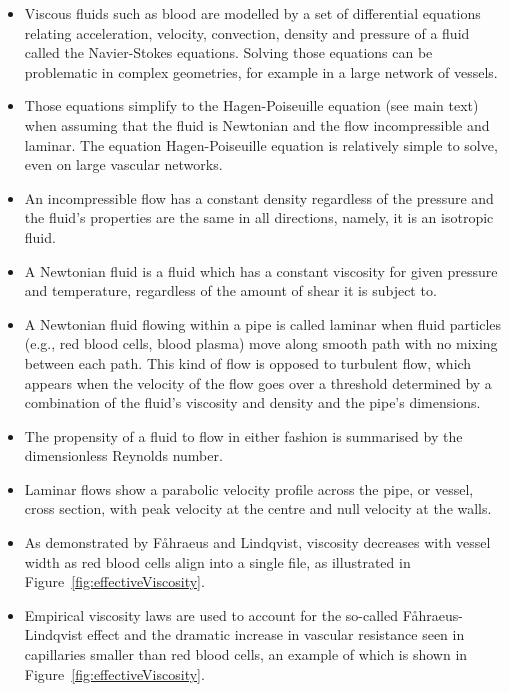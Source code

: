 \documentclass{article}
\begin{document}
\begin{tcolorbox}[title=Additional information -- Fluid flow modelling]
  \begin{itemize}
  \item Viscous fluids such as blood are modelled by a set of differential equations relating acceleration, velocity, convection, density and pressure of a fluid called the Navier-Stokes equations.
    Solving those equations can be problematic in complex geometries, for example in a large network of vessels.
  \item Those equations simplify to the Hagen-Poiseuille equation (see main text) when assuming that the fluid is Newtonian and the flow incompressible and laminar.
    The equation Hagen-Poiseuille equation is relatively simple to solve, even on large vascular networks.
  \item An incompressible flow has a constant density regardless of the pressure and the fluid's properties are the same in all directions, namely, it is an isotropic fluid.
  \item A Newtonian fluid is a fluid which has a constant viscosity for given pressure and temperature, regardless of the amount of shear it is subject to.
  \item A Newtonian fluid flowing within a pipe is called laminar when fluid particles (e.g., red blood cells, blood plasma) move along smooth path with no mixing between each path.
    This kind of flow is opposed to turbulent flow, which appears when the velocity of the flow goes over a threshold determined by a combination of the fluid's viscosity and density and the pipe's dimensions.
  \item The propensity of a fluid to flow in either fashion is summarised by the dimensionless Reynolds number.
  \item Laminar flows show a parabolic velocity profile across the pipe, or vessel, cross section, with peak velocity at the centre and null velocity at the walls.
  \item As demonstrated by F\r ahraeus and Lindqvist, viscosity decreases with vessel width as red blood cells align into a single file, as illustrated in Figure~\ref{fig:effectiveViscosity}.~\cite{Faahraeus_1931}
  \item Empirical viscosity laws are used to account for the so-called F\r ahraeus-Lindqvist effect and the dramatic increase in vascular resistance seen in capillaries smaller than red blood cells, an example of which is shown in Figure~\ref{fig:effectiveViscosity}.~\cite{Haynes_1960,Pries_1990,Secomb_2013}
  \end{itemize}
\end{tcolorbox}
\end{document}
